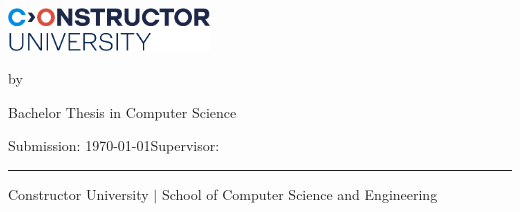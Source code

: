 
\thispagestyle{empty}

\begin{flushright}
  \includegraphics[width=0.4\textwidth]{figures/bsc-logo}
\end{flushright}
\vspace*{40mm}
\begin{center}
  \huge
  \textbf{\mytitle}
\end{center}
\vspace*{4mm}
\begin{center}
 \Large by
\end{center}
\vspace*{4mm}
\begin{center}
  \LARGE
  \textbf{\myname}
\end{center}
\vspace*{20mm}
\begin{center}
  \Large
  Bachelor Thesis in Computer Science
\end{center}
\vfill
\begin{flushleft}
  \large
  Submission: \today \hfill Supervisor: \mysupervisor \\
  \rule{\textwidth}{1pt}
\end{flushleft}
\begin{center}
  Constructor University $|$ School of Computer Science and Engineering
\end{center}

\newpage 